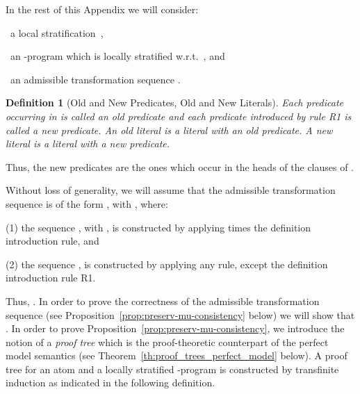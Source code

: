 \documentclass[english]{tlp}
\newtheorem{definition}{Definition} \newtheorem{example}{Example}       \newtheorem{remark}{Remark}
\begin{document}
\medskip
In the rest of this Appendix we will consider:

\noindent
{}~a local stratification~, 

\noindent
{}~an -program  
which is locally stratified w.r.t.~, and 

\noindent
{}~an
admissible transformation sequence . 


\begin{definition}[Old and New Predicates, Old and New Literals]
\label{def:old-new}Each predicate
occurring in  is called an {\em old predicate} and each
predicate introduced by rule {\rm{R1}} is called a {\em new
predicate}. An {\em{old literal}} is a literal with an old predicate.
A {\em{new literal}} is a literal with a new predicate.
\end{definition}

Thus, the new predicates are the ones
which occur in the heads of the clauses of .

Without loss of generality, we will assume that the admissible
transformation sequence  is of the form , with , where:

\smallskip

\noindent \textup{(1)} the sequence , with
, is constructed by applying  times the
definition introduction rule, and

\noindent \textup{(2)} the sequence , is
constructed by applying any rule, except the definition introduction
rule R1.

\smallskip{}

\noindent Thus, . In order to
prove the correctness of the admissible transformation sequence
 (see
Proposition~\ref{prop:preserv-mu-consistency} below) we will show that
. In order to prove
Proposition~\ref{prop:preserv-mu-consistency}, we introduce
the notion of a {\em proof tree}  which is the proof-theoretic counterpart of the perfect model semantics (see
Theorem~\ref{th:proof_trees_perfect_model} below). 
A proof tree for an atom  and a locally stratified -program
 is constructed by transfinite induction as indicated in the
following definition.
\end{document}
